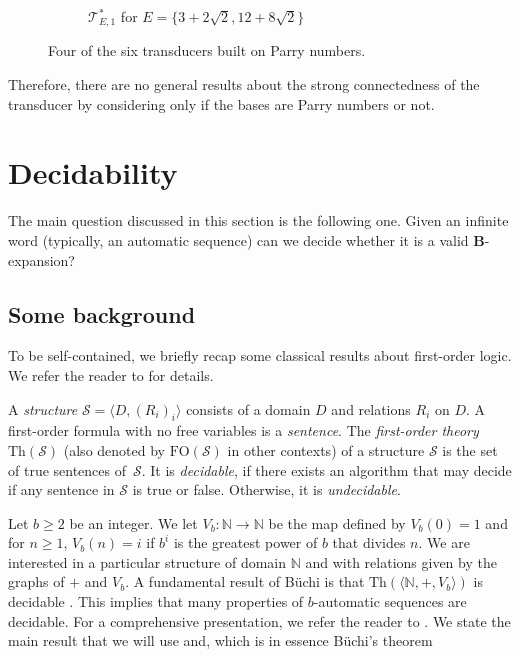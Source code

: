 \documentclass[12pt,reqno]{amsart}
\newcommand{\B}{{\mathbf{B}}}
\begin{document}
\begin{figure}[ht]
\begin{subfigure}{\textwidth}
    \caption{$\mathcal{T}^*_{E,1}$ for $E=\{3+2\sqrt{2},12+8\sqrt{2}\}$}
\end{subfigure}
  \caption{Four of the six transducers built on Parry numbers.}
  \label{fig:connectedness}
\end{figure}


Therefore, there are no general results about the strong connectedness of the transducer by considering only if the bases are Parry numbers or not. 

\section{Decidability}\label{sec:decidability}

The main question discussed in this section is the following one. Given an infinite word (typically, an automatic sequence) can we decide whether it is a valid $\B$-expansion?

\subsection{Some background}
To be self-contained, we briefly recap some classical results about first-order logic. We refer the reader to \cite{BHMV,RigoBook} for details. 

A \emph{structure} $\mathcal{S}=\langle D, (R_i)_i\rangle$ consists of a domain $D$ and relations $R_i$ on $D$. 
A first-order formula with no free variables is a {\em sentence}.
The \emph{first-order theory} $\text{Th}(\mathcal{S})$ (also denoted by $\text{FO}(\mathcal{S})$ in other contexts) of a structure $\mathcal{S}$ is the set of true sentences of~$\mathcal{S}$. It is \emph{decidable}, if there exists an algorithm that may decide if any sentence in $\mathcal{S}$ is true or false. Otherwise, it is \emph{undecidable}. 

Let $b\ge 2$ be an integer. We let $V_b\colon \mathbb{N}\to \mathbb{N}$ be the map defined by $V_b(0)=1$ and for $n\ge 1$, $V_b(n)=i$ if $b^i$ is the greatest power of $b$ that divides $n$. We are interested in a particular structure of domain $\mathbb{N}$ and with relations given by the graphs of $+$ and $V_b$. 
A fundamental result of B\"uchi is that $\text{Th}(\langle\mathbb{N},+,V_b\rangle)$ is decidable \cite{Buchi1960}. This implies that many properties of $b$-automatic sequences are decidable. For a comprehensive presentation, we refer the reader to \cite{ShallitBook}. We state the main result that we will use and, which is in essence B\"uchi's theorem \cite[Thm.~6.4.1]{ShallitBook}
\end{document}
